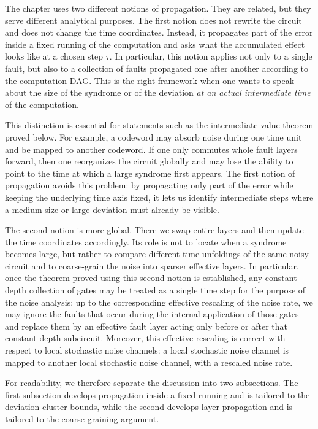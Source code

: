 The chapter uses two different notions of propagation. They are related, but they serve different analytical purposes. The first notion does not rewrite the circuit and does not change the time coordinates. Instead, it propagates part of the error inside a fixed running of the computation and asks what the accumulated effect looks like at a chosen step $\tau$. In particular, this notion applies not only to a single fault, but also to a collection of faults propagated one after another according to the computation DAG. This is the right framework when one wants to speak about the size of the syndrome or of the deviation \emph{at an actual intermediate time} of the computation.

This distinction is essential for statements such as the intermediate value theorem proved below. For example, a codeword may absorb noise during one time unit and be mapped to another codeword. If one only commutes whole fault layers forward, then one reorganizes the circuit globally and may lose the ability to point to the time at which a large syndrome first appears. The first notion of propagation avoids this problem: by propagating only part of the error while keeping the underlying time axis fixed, it lets us identify intermediate steps where a medium-size or large deviation must already be visible.

The second notion is more global. There we swap entire layers and then update the time coordinates accordingly. Its role is not to locate when a syndrome becomes large, but rather to compare different time-unfoldings of the same noisy circuit and to coarse-grain the noise into sparser effective layers. In particular, once the theorem proved using this second notion is established, any constant-depth collection of gates may be treated as a single time step for the purpose of the noise analysis: up to the corresponding effective rescaling of the noise rate, we may ignore the faults that occur during the internal application of those gates and replace them by an effective fault layer acting only before or after that constant-depth subcircuit. Moreover, this effective rescaling is correct with respect to local stochastic noise channels: a local stochastic noise channel is mapped to another local stochastic noise channel, with a rescaled noise rate.

For readability, we therefore separate the discussion into two subsections. The first subsection develops propagation inside a fixed running and is tailored to the deviation-cluster bounds, while the second develops layer propagation and is tailored to the coarse-graining argument.



